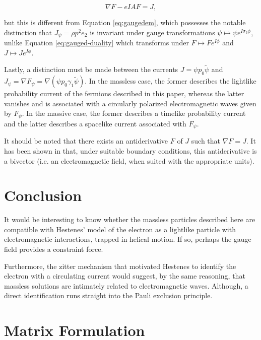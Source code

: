 \documentclass[twocolumn]{article}
\begin{document}
    \begin{equation}
      \nabla F - e I A F = J,\label{eq:gauged-duality}
    \end{equation}

    but this is different from Equation \ref{eq:gaugedem}, which possesses the notable distinction that $J_\psi = \rho p^2 e_2$ is invariant under gauge transformations $\psi \mapsto \psi e^{I \sigma_3 \phi}$, unlike Equation \ref{eq:gauged-duality} which transforms under $F \mapsto F e^{I \phi}$ and $J \mapsto J e^{I \phi}$.

  Lastly, a distinction must be made between the currents $J = \psi p_0 \widetilde \psi$ and $J_\psi = \nabla F_\psi = \nabla (\psi p_0 \gamma_1 \widetilde \psi)$. In the massless case, the former describes the lightlike probability current of the fermions described in this paper, whereas the latter vanishes and is associated with a circularly polarized electromagnetic waves given by $F_\psi$. In the massive case, the former describes a timelike probability current and the latter describes a spacelike current associated with $F_\psi$. 

  It should be noted that there exists an antiderivative $F$ of $J$ such that $\nabla F = J$. It has been shown in \cite{continuity-equation} that, under suitable boundary conditions, this antiderivative is a bivector (i.e. an electromagnetic field, when suited with the appropriate units).

  \section{Conclusion}

  It would be interesting to know whether the massless particles described here are compatible with Hestenes' model of the electron as a lightlike particle with electromagnetic interactions, trapped in helical motion.\cite{zitter} If so, perhaps the gauge field provides a constraint force.

  Furthermore, the zitter mechanism that motivated Hestenes to identify the electron with a circulating current would suggest, by the same reasoning, that massless solutions are intimately related to electromagnetic waves. Although, a direct identification runs straight into the Pauli exclusion principle.

  \newpage

  \appendix

  \section{Matrix Formulation} \label{matrix}
\end{document}

